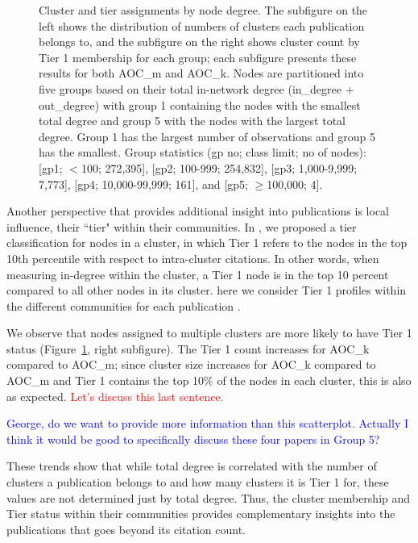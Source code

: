 \documentclass[12pt, oneside]{article}   	%
\begin{document}
\begin{figure}[H]
\begin{subfigure}[t]{0.48\textwidth}
    	\end{subfigure}
\captionsetup{width=0.9\textwidth}	
\caption{Cluster and tier assignments by node degree. The subfigure on the left shows the distribution of numbers of clusters each publication belongs to, and the subfigure on the right shows cluster count by Tier 1 membership for each group; each subfigure presents these results for both AOC\_m and AOC\_k. Nodes are partitioned into five groups based on their total in-network degree (in\_degree + out\_degree) with group 1 containing the nodes with the smallest total degree and group 5 with the nodes with the largest total degree. Group 1 has the largest number of observations and group 5 has the smallest. Group statistics (gp no; class limit; no of nodes): [gp1; $<$100;  272,395], [gp2; 100-999; 254,832], [gp3; 1,000-9,999; 7,773], [gp4; 10,000-99,999; 161], and [gp5; $\geq$100,000; 4]. }
\label{fig:fig3}
\end{figure}

Another perspective that provides additional insight into publications is local influence, their ``tier" within their communities. In \cite{Chandrasekharan2021}, we  proposed a tier classification for nodes in a cluster, in which Tier 1 refers to the nodes in the top 10th percentile with respect to intra-cluster citations. In other words, when measuring in-degree within the cluster, a Tier 1 node is in the top 10 percent compared to all other nodes in its cluster. here we consider Tier 1 profiles within the different communities for each publication .
 
We observe that nodes assigned to multiple clusters are more likely to have Tier 1 status (Figure~\ref{fig:fig3}, right subfigure). The Tier 1 count increases for AOC\_k compared to AOC\_m; since cluster size  increases for AOC\_k compared to AOC\_m and Tier 1 contains the top 10\% of the nodes in each cluster, this is also as expected. \textcolor{red}{Let's discuss this last sentence.}

\textcolor{blue}{George, do we want to provide more information than this scatterplot. Actually I think it would be good to specifically discuss these four papers in Group 5?}


These trends show that while total degree is correlated with the number of clusters a publication belongs to and how many clusters it is Tier 1 for,
these values are not determined just by total degree. Thus, the cluster membership and Tier status within their communities provides complementary insights into  the publications that goes beyond its citation count.
  
\end{document}
